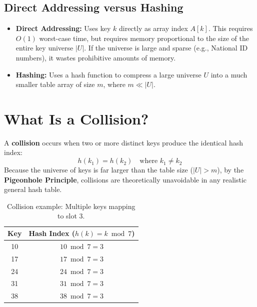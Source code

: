 \subsection{Direct Addressing versus Hashing}
\begin{itemize}
    \item \textbf{Direct Addressing:} Uses key $k$ directly as array index $A[k]$. This requires $O(1)$ worst-case time, but requires memory proportional to the size of the entire key universe $|U|$. If the universe is large and sparse (e.g., National ID numbers), it wastes prohibitive amounts of memory.
    \item \textbf{Hashing:} Uses a hash function to compress a large universe $U$ into a much smaller table array of size $m$, where $m \ll |U|$.
\end{itemize}

\section{What Is a Collision?}

A \textbf{collision} occurs when two or more distinct keys produce the identical hash index:
\[
h(k_1) = h(k_2) \quad \text{where } k_1 \neq k_2
\]
Because the universe of keys is far larger than the table size ($|U| > m$), by the \textbf{Pigeonhole Principle}, collisions are theoretically unavoidable in any realistic general hash table.

\begin{table}[htbp]
\centering
\small
\begin{tabular}{c c}
\toprule
\textbf{Key} & \textbf{Hash Index ($h(k) = k \bmod 7$)} \\
\midrule
10 & $10 \bmod 7 = 3$ \\
17 & $17 \bmod 7 = 3$ \\
24 & $24 \bmod 7 = 3$ \\
31 & $31 \bmod 7 = 3$ \\
38 & $38 \bmod 7 = 3$ \\
\bottomrule
\end{tabular}
\caption{Collision example: Multiple keys mapping to slot 3.}
\end{table}

